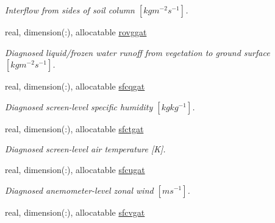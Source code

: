 \begin{DoxyCompactItemize}
\begin{DoxyCompactList}\small\item\em Interflow from sides of soil column $[kg m^{-2} s^{-1} ]$. \end{DoxyCompactList}\item 
\hypertarget{structclass__statevars_1_1class__gather_adbb188bbd89bff1bbdb4bb5b628eee2a}{}real, dimension(\+:), allocatable \hyperlink{structclass__statevars_1_1class__gather_adbb188bbd89bff1bbdb4bb5b628eee2a}{rovggat}\label{structclass__statevars_1_1class__gather_adbb188bbd89bff1bbdb4bb5b628eee2a}

\begin{DoxyCompactList}\small\item\em Diagnosed liquid/frozen water runoff from vegetation to ground surface $[kg m^{-2} s^{-1} ]$. \end{DoxyCompactList}\item 
\hypertarget{structclass__statevars_1_1class__gather_a392226f5396f6645e37bc801e8c9cc95}{}real, dimension(\+:), allocatable \hyperlink{structclass__statevars_1_1class__gather_a392226f5396f6645e37bc801e8c9cc95}{sfcqgat}\label{structclass__statevars_1_1class__gather_a392226f5396f6645e37bc801e8c9cc95}

\begin{DoxyCompactList}\small\item\em Diagnosed screen-\/level specific humidity $[kg kg^{-1} ]$. \end{DoxyCompactList}\item 
\hypertarget{structclass__statevars_1_1class__gather_a1c3c306712049d895178b11dd86f5a88}{}real, dimension(\+:), allocatable \hyperlink{structclass__statevars_1_1class__gather_a1c3c306712049d895178b11dd86f5a88}{sfctgat}\label{structclass__statevars_1_1class__gather_a1c3c306712049d895178b11dd86f5a88}

\begin{DoxyCompactList}\small\item\em Diagnosed screen-\/level air temperature \mbox{[}K\mbox{]}. \end{DoxyCompactList}\item 
\hypertarget{structclass__statevars_1_1class__gather_a629f5b29ad807f8763f1e8eccae4d665}{}real, dimension(\+:), allocatable \hyperlink{structclass__statevars_1_1class__gather_a629f5b29ad807f8763f1e8eccae4d665}{sfcugat}\label{structclass__statevars_1_1class__gather_a629f5b29ad807f8763f1e8eccae4d665}

\begin{DoxyCompactList}\small\item\em Diagnosed anemometer-\/level zonal wind $[m s^{-1} ]$. \end{DoxyCompactList}\item 
\hypertarget{structclass__statevars_1_1class__gather_acd75d2d6cdf0f9e524c892525c024292}{}real, dimension(\+:), allocatable \hyperlink{structclass__statevars_1_1class__gather_acd75d2d6cdf0f9e524c892525c024292}{sfcvgat}\label{structclass__statevars_1_1class__gather_acd75d2d6cdf0f9e524c892525c024292}


\end{DoxyCompactItemize}
